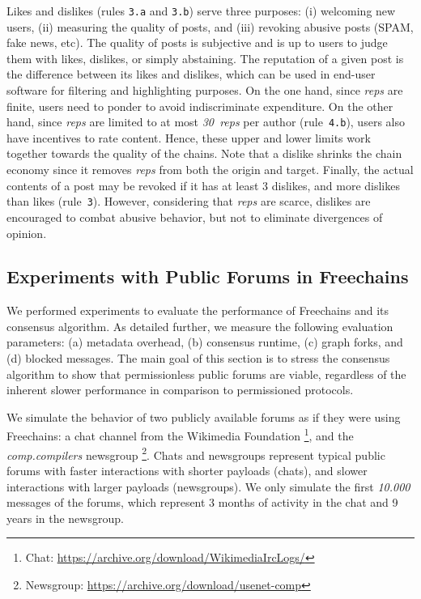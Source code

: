 \documentclass[12pt]{article}
\newcommand{\FC}       {Freechains\xspace}
\newcommand{\reps}     {\emph{reps}\xspace}
\newcommand{\nreps}[1] {\emph{#1~reps\xspace}}
\newcommand{\code}[1]  {\texttt{\footnotesize{#1}}}
\begin{document}
Likes and dislikes (rules \code{3.a} and \code{3.b}) serve three purposes:
    (i) welcoming new users,
    (ii) measuring the quality of posts, and
    (iii) revoking abusive posts (SPAM, fake news, etc).
%
The quality of posts is subjective and is up to users to judge them with likes,
dislikes, or simply abstaining.
%
%
The reputation of a given post is the difference between its likes and
dislikes, which can be used in end-user software for filtering and highlighting
purposes.
%
On the one hand, since \reps are finite, users need to ponder to avoid
indiscriminate expenditure.
On the other hand, since \reps are limited to at most \nreps{30} per author
(rule~\code{4.b}), users also have incentives to rate content.
Hence, these upper and lower limits work together towards the quality of the
chains.
%
Note that a dislike shrinks the chain economy since it removes \reps from both
the origin and target.
Finally, the actual contents of a post may be revoked if it has at least 3
dislikes, and more dislikes than likes (rule~\code{3}).
However, considering that \reps are scarce, dislikes are encouraged to combat
abusive behavior, but not to eliminate divergences of opinion.

\subsection{Experiments with Public Forums in \FC}
\label{sec.evaluation}

We performed experiments to evaluate the performance of \FC and its consensus
algorithm.
%
As detailed further, we measure the following evaluation parameters:
    (a) metadata overhead,
    (b) consensus runtime,
    (c) graph forks, and
    (d) blocked messages.
%
The main goal of this section is to stress the consensus algorithm to show that
permissionless public forums are viable, regardless of the inherent slower
performance in comparison to permissioned protocols.

We simulate the behavior of two publicly available forums as if they were using
\FC:
%
    a chat channel from the Wikimedia Foundation%
\footnote{ Chat: \url{https://archive.org/download/WikimediaIrcLogs/} }, and
    the \emph{comp.compilers} newsgroup%
\footnote{ Newsgroup: \url{https://archive.org/download/usenet-comp} }.
%
Chats and newsgroups represent typical public forums with
    faster interactions with shorter payloads (chats), and
    slower interactions with larger payloads (newsgroups).
%
We only simulate the first \emph{10.000} messages of the forums, which
represent 3 months of activity in the chat and 9 years in the newsgroup.
\end{document}
